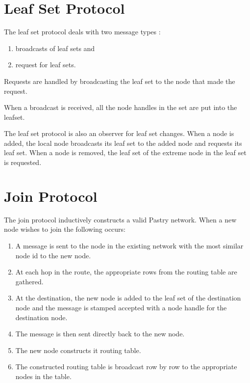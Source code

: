 \documentclass{article}
\begin{document}
\section{Leaf Set Protocol}

The leaf set protocol deals with two message types : 

\begin{enumerate}

\item broadcasts of leaf sets and
\item request for leaf sets.  

\end{enumerate}

Requests are handled by broadcasting the leaf set to the node that
made the request.  

When a broadcast is received, all the node handles in the set are put
into the leafset.

The leaf set protocol is also an observer for leaf set changes.
When a node is added, the local node broadcasts its leaf set to the
added node and requests its leaf set.  
When a node is removed, the leaf set of the extreme node in the leaf
set is requested.

\section{Join Protocol}

The join protocol inductively constructs a valid Pastry network.
When a new node wishes to join the following occurs:

\begin{enumerate}

\item A message is sent to the node in the existing network with the
  most similar node id to the new node.
\item At each hop in the route, the appropriate rows from the routing
  table are gathered.
\item At the destination, the new node is added to the leaf set of the
  destination node and the message is stamped accepted with a node
  handle for the destination node.
\item The message is then sent directly back to the new node.
\item The new node constructs it routing table.
\item The constructed routing table is broadcast row by row to the
  appropriate nodes in the table.

\end{enumerate}
\end{document}

